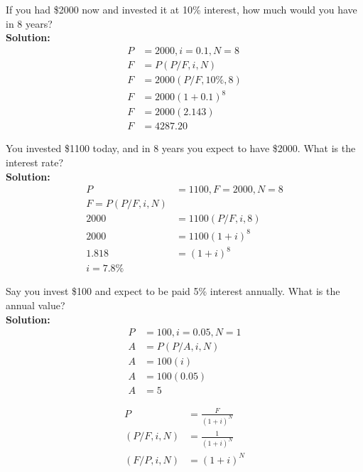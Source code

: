\begin{example}
    If you had \$2000 now and invested it at 10\% interest, how much would you have in 8 years? \\
    \textbf{Solution:}
    \begin{align}
        P & = 2000, i = 0.1, N = 8 \\
        F & = P(P/F, i, N)         \\
        F & = 2000(P/F, 10\%, 8)   \\
        F & = 2000(1+0.1)^8        \\
        F & = 2000(2.143)          \\
        F & = 4287.20
    \end{align}
\end{example}
\begin{example}
    You invested \$1100 today, and in 8 years you expect to have \$2000. What is the interest rate? \\
    \textbf{Solution:}
    \begin{align}
        P     & = 1100, F = 2000, N = 8 \\
        F = P(P/F, i, N)                \\
        2000  & = 1100(P/F, i, 8)       \\
        2000  & = 1100(1+i)^8           \\
        1.818 & = (1+i)^8               \\
        i = 7.8\%
    \end{align}
\end{example}

\begin{example}
    Say you invest \$100 and expect to be paid 5\% interest annually. What is the annual value? \\
    \textbf{Solution:}
    \begin{align}
        P & = 100, i = 0.05, N = 1 \\
        A & = P(P/A, i, N)         \\
        A & = 100(i)               \\
        A & = 100(0.05)            \\
        A & = 5
    \end{align}
\end{example}


\begin{definition}
    \begin{align}
        P           & = \frac{F}{(1+i)^N} \\
        (P/F, i, N) & = \frac{1}{(1+i)^N} \\
        (F/P, i, N) & = (1+i)^N
    \end{align}
\end{definition}

